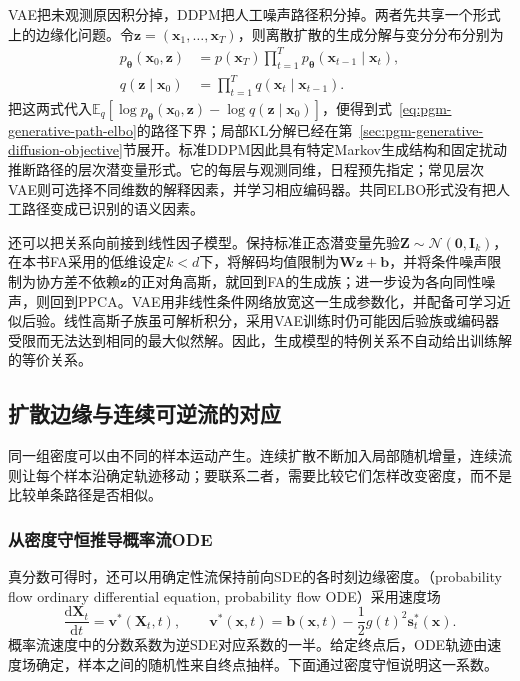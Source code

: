 VAE把未观测原因积分掉，DDPM把人工噪声路径积分掉。两者先共享一个形式上的边缘化问题。令$\bm z=(\bm x_1,\ldots,\bm x_T)$，则离散扩散的生成分解与变分分布分别为
\begin{equation}
  \label{eq:pgm-generative-ddpm-hierarchical-relation}
  \begin{aligned}
    p_{\bm\theta}(\bm x_0,\bm z)
      &=p(\bm x_T)\prod_{t=1}^{T}
                    p_{\bm\theta}(\bm x_{t-1}\mid\bm x_t),\\
    q(\bm z\mid\bm x_0)
      &=\prod_{t=1}^{T}q(\bm x_t\mid\bm x_{t-1}).
  \end{aligned}
\end{equation}
把这两式代入$\mathbb E_q[\log p_{\bm\theta}(\bm x_0,\bm z)-\log q(\bm z\mid\bm x_0)]$，便得到式~\eqref{eq:pgm-generative-path-elbo}的路径下界；局部KL分解已经在第~\ref{sec:pgm-generative-diffusion-objective}节展开。标准DDPM因此具有特定Markov生成结构和固定扰动推断路径的层次潜变量形式。它的每层与观测同维，日程预先指定；常见层次VAE则可选择不同维数的解释因素，并学习相应编码器。共同ELBO形式没有把人工路径变成已识别的语义因素。



还可以把关系向前接到线性因子模型。保持标准正态潜变量先验$\bm Z\sim\mathcal N(\bm0,\bm I_k)$，在本书FA采用的低维设定$k<d$下，将解码均值限制为$\bm W\bm z+\bm b$，并将条件噪声限制为协方差不依赖$\bm z$的正对角高斯，就回到FA的生成族；进一步设为各向同性噪声，则回到PPCA。VAE用非线性条件网络放宽这一生成参数化，并配备可学习近似后验。线性高斯子族虽可解析积分，采用VAE训练时仍可能因后验族或编码器受限而无法达到相同的最大似然解。因此，生成模型的特例关系不自动给出训练解的等价关系。

\subsection{扩散边缘与连续可逆流的对应}
\label{sec:pgm-generative-diffusion-flow-relation}

同一组密度可以由不同的样本运动产生。连续扩散不断加入局部随机增量，连续流则让每个样本沿确定轨迹移动；要联系二者，需要比较它们怎样改变密度，而不是比较单条路径是否相似。

\subsubsection{从密度守恒推导概率流ODE}
\label{sec:pgm-generative-probability-flow-derivation}

真分数可得时，还可以用确定性流保持前向SDE的各时刻边缘密度。（probability flow ordinary differential equation, probability flow ODE）采用速度场
\begin{equation}
  \label{eq:pgm-generative-probability-flow}
  \frac{\mathrm{d}\bm{X}_t}{\mathrm{d}t}
     =\bm{v}^*(\bm{X}_t,t),
  \qquad
  \bm{v}^*(\bm{x},t)
     =\bm{b}(\bm{x},t)-\frac12g(t)^2\bm{s}_t^*(\bm{x}).
\end{equation}
概率流速度中的分数系数为逆SDE对应系数的一半。给定终点后，ODE轨迹由速度场确定，样本之间的随机性来自终点抽样。下面通过密度守恒说明这一系数。

